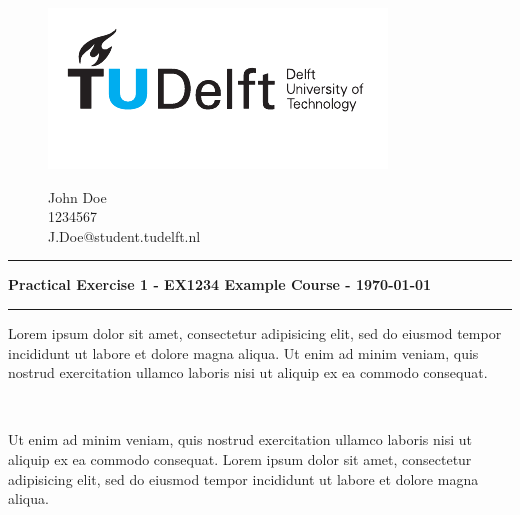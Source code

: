 \documentclass[a4paper, answers, addpoints]{exam}
\begin{document}
\begin{figure}
    \begin{minipage}[H]{0.33\textwidth}
		\vspace{0.3cm}
		\includegraphics[scale=0.8]{TUDelftLogo.pdf}
	\end{minipage}
	\begin{minipage}[H]{0.33\textwidth}
    \hfill
	\end{minipage}
	\begin{minipage}[H]{0.33\textwidth}
		\begin{center}
		\large{John Doe}\\
		\normalsize
			1234567\\
			J.Doe@student.tudelft.nl
		\end{center}
	\end{minipage}
\end{figure}
\vspace{-2cm}
\hrule
\begin{center}
	\textbf{Practical Exercise 1 - EX1234 Example Course  - \today}\\
\end{center}
\hrule
\vspace{0.3cm}
    \begin{questions}
        \question[2] Lorem ipsum dolor sit amet, consectetur adipisicing elit, sed do eiusmod tempor incididunt ut labore et dolore magna aliqua. Ut enim ad minim veniam, quis nostrud exercitation ullamco laboris nisi ut aliquip ex ea commodo consequat.
        \begin{solution}\\
            \blindmathpaper
        \end{solution}
        \question[2] Ut enim ad minim veniam, quis nostrud exercitation ullamco laboris nisi ut aliquip ex ea commodo consequat. Lorem ipsum dolor sit amet, consectetur adipisicing elit, sed do eiusmod tempor incididunt ut labore et dolore magna aliqua.
        \begin{solution}\\
            \blindmathpaper
        \end{solution}
    \end{questions}
\end{document}
